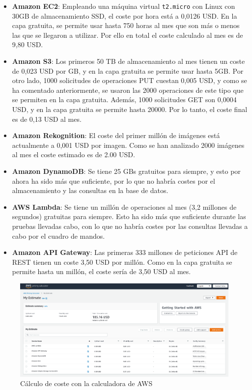 \begin{itemize}
    \item \textbf{Amazon EC2}: Empleando una máquina virtual \texttt{t2.micro} con Linux con 30GB de almacenamiento SSD, el coste por hora está a 0,0126 USD. En la capa gratuita, se permite usar hasta 750 horas al mes que son más o menos las que se llegaron a utilizar. Por ello en total el coste calculado al mes es de 9,80 USD.
    \item \textbf{Amazon S3}: Los primeros 50 TB de almacenamiento al mes tienen un coste de 0,023 USD por GB, y en la capa gratuita se permite usar hasta 5GB. Por otro lado, 1000 solicitudes de operaciones PUT cuestan 0,005 USD, y como se ha comentado anteriormente, se usaron las 2000 operaciones de este tipo que se permiten en la capa gratuita. Además, 1000 solicitudes GET son 0,0004 USD, y en la capa gratuita se permite hasta 20000. Por lo tanto, el coste final es de 0,13 USD al mes.
    \item \textbf{Amazon Rekognition}: El coste del primer millón de imágenes está actualmente a 0,001 USD por imagen. Como se han analizado 2000 imágenes al mes el coste estimado es de 2.00 USD.
    \item \textbf{Amazon DynamoDB}: Se tiene 25 GBs gratuitos para siempre, y esto por ahora ha sido más que suficiente, por lo que no habría costes por el almacenamiento y las consultas en la base de datos.
    \item \textbf{AWS Lambda}: Se tiene un millón de operaciones al mes (3,2 millones de segundos) gratuitas para siempre. Esto ha sido más que suficiente durante las pruebas llevadas cabo, con lo que no habría costes por las consultas llevadas a cabo por el cuadro de mandos.
    \item \textbf{Amazon API Gateway}: Las primeras 333 millones de peticiones API de REST tienen un coste 3,50 USD por millón. Como en la capa gratuita se permite hasta un millón, el coste sería de 3,50 USD al mes.
\end{itemize}

\begin{figure}[H]
    \centering
    \includegraphics[width=1.0\textwidth]{memoria/img/coste_aws.png}
    \caption{Cálculo de coste con la calculadora de AWS}
    \label{fig:coste_aws}
\end{figure}

